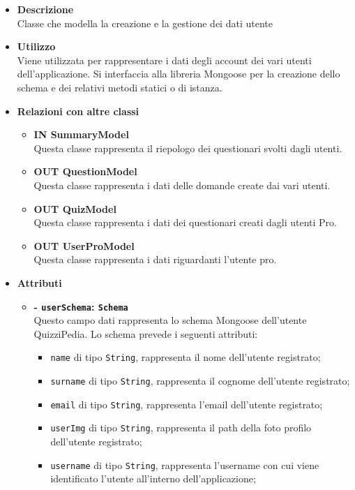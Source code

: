 \begin{itemize}
	\item \textbf{Descrizione} \\
	Classe che modella la creazione e la gestione dei dati utente
	\item \textbf{Utilizzo} \\
	Viene utilizzata per rappresentare i dati degli account dei vari utenti dell'applicazione. Si interfaccia alla libreria Mongoose per la creazione dello schema e dei relativi metodi statici o di istanza.
	\item \textbf{Relazioni con altre classi} 
		\begin{itemize}
			\item \textbf{IN SummaryModel} \\
			Questa classe rappresenta il riepologo dei questionari svolti dagli utenti.
			\item \textbf{OUT QuestionModel} \\
			Questa classe rappresenta i dati delle domande create dai vari utenti.
			\item \textbf{OUT QuizModel} \\
			Questa classe rappresenta i dati dei questionari creati dagli utenti Pro.
			\item \textbf{OUT UserProModel} \\
			Questa classe rappresenta i dati riguardanti l'utente pro.
		\end{itemize}
	\item \textbf{Attributi} 
		\begin{itemize}
			\item \textbf{- \texttt{userSchema}: \texttt{Schema}} \\
			Questo campo dati rappresenta lo schema Mongoose dell'utente QuizziPedia. Lo schema prevede i seguenti attributi:
			\begin{itemize}
				\item 
					\texttt{name} di tipo \texttt{String}, rappresenta il nome  dell'utente registrato;
				\item 
					\texttt{surname} di tipo \texttt{String}, rappresenta il cognome  dell'utente registrato;
				\item 
					\texttt{email} di tipo \texttt{String}, rappresenta l'email  dell'utente registrato;
				\item 
					\texttt{userImg} di tipo \texttt{String}, rappresenta il path della foto profilo dell'utente registrato;
				\item 
					\texttt{username} di tipo \texttt{String}, rappresenta l'username con cui viene identificato l'utente all'interno dell'applicazione;		

\end{itemize}
\end{itemize}
\end{itemize}
